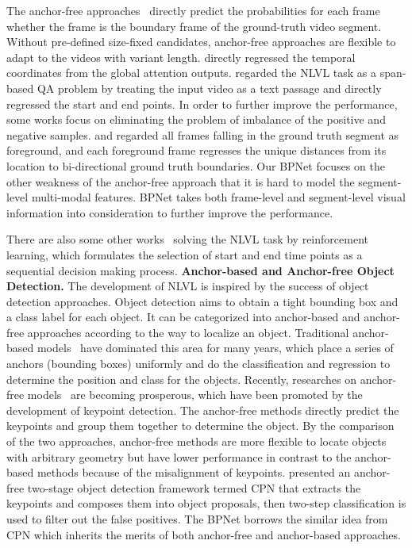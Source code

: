 \documentclass[letterpaper]{article} %
\begin{document}
The anchor-free approaches~\cite{DBLP:conf/aaai/YuanM019,LuCTLX19,DBLP:conf/aaai/ChenLTXZTL20,ChenCMJC18,DBLP:conf/acl/ZhangSJZ20} directly predict the probabilities for each frame whether the
frame is the boundary frame of the ground-truth video segment.
Without pre-defined size-fixed candidates, anchor-free approaches are flexible to adapt to the videos with variant length.
\citet{DBLP:conf/aaai/YuanM019} directly regressed the temporal
coordinates from the global attention outputs.
\citet{DBLP:conf/acl/ZhangSJZ20} regarded the NLVL task as a span-based QA
problem by treating the input video as a text passage and directly regressed
the start and end points.
In order to further improve the performance, some works focus on eliminating the problem of imbalance of the positive and negative samples.
\citet{LuCTLX19} and \citet{DBLP:conf/aaai/ChenLTXZTL20} regarded all frames falling in the ground
truth segment as foreground, and each foreground frame regresses the unique distances from its location to bi-directional ground truth boundaries.
Our BPNet focuses on the other weakness of the anchor-free approach that it is hard
to model the segment-level multi-modal features. BPNet takes
both frame-level and segment-level visual information into consideration to further improve the performance.

There are also some other works~\cite{DBLP:conf/aaai/HeZHLLW19,DBLP:conf/cvpr/WangHW19} solving the NLVL task by reinforcement learning, which formulates the selection of start and end time points as a sequential decision making process.
\textbf{Anchor-based and Anchor-free Object Detection.}
The development of NLVL is inspired by the success of object detection approaches.
Object detection aims to obtain a tight bounding box and a class label
for each object.
It can be categorized into anchor-based and anchor-free approaches according to
the way to localize an object.
Traditional anchor-based models~\cite{DBLP:conf/nips/RenHGS15,DBLP:conf/nips/DaiLHS16}
have dominated this area for many years,
which place a series of anchors (bounding boxes) uniformly and do the classification and regression to determine the position and class for the objects.
Recently, researches on anchor-free models~\cite{DBLP:conf/eccv/LawD18,DBLP:conf/iccv/DuanBXQH019}
are becoming prosperous, which have
been promoted by the development of keypoint detection.
The anchor-free methods directly predict the keypoints and group them together
to determine the object.
By the comparison of the two approaches, anchor-free methods are more flexible to locate objects with arbitrary geometry but have lower performance in contrast to the anchor-based methods because of the misalignment of keypoints.
\citet{DBLP:conf/eccv/Duan} presented an anchor-free two-stage object detection framework termed CPN that extracts the keypoints and composes them into object proposals, then two-step classification is used to filter out the false positives.
The BPNet borrows the similar idea from CPN which inherits the merits of both anchor-free and anchor-based approaches.
\end{document}
